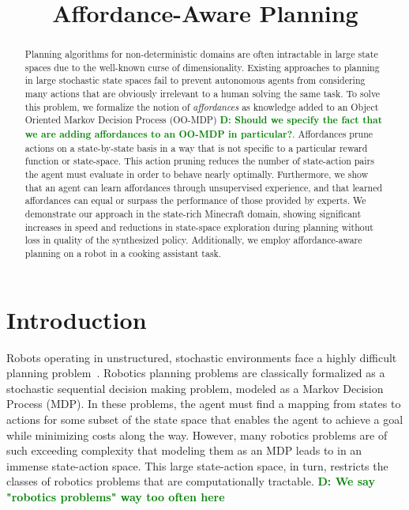 \documentclass[conference]{IEEEtran}
\newcommand{\dnote}[1]{\textcolor{Green}{\textbf{D: #1}}}
\begin{document}
\title{Affordance-Aware Planning}

\author{
}

\maketitle

\begin{abstract}
Planning algorithms for non-deterministic domains are often
intractable in large state spaces due to the well-known curse of
dimensionality. Existing approaches to planning in large stochastic state spaces fail to
prevent autonomous agents from considering many actions that are
obviously irrelevant to a human solving the same task. To solve this problem,
we formalize the notion of {\em affordances} as knowledge added to an 
Object Oriented Markov Decision Process (OO-MDP) \dnote{Should we specify the fact that
we are adding affordances to an OO-MDP in particular?}.
Affordances prune actions on a state-by-state basis in a way that is
not specific to a particular reward function or state-space. This action pruning
reduces the number of state-action pairs the agent must evaluate
in order to behave nearly optimally. Furthermore, we show that an
agent can learn affordances through unsupervised experience, and that learned
affordances can equal or surpass the performance of those
provided by experts. We demonstrate our approach in the state-rich
Minecraft domain, showing significant increases in speed and reductions in state-space exploration during
planning without loss in quality of the synthesized policy. Additionally, we employ affordance-aware planning on a robot in a cooking assistant task. 

\end{abstract}

\IEEEpeerreviewmaketitle

\section{Introduction}
\label{sec:introduction}

Robots operating in unstructured, stochastic environments face
a highly difficult planning problem~\citep{bollini12, knepper13}.
Robotics planning problems are classically formalized as a stochastic sequential
decision making problem, modeled as a Markov Decision Process (MDP). In these problems,
the agent must find a mapping from states to actions for some subset of the state space that enables the
agent to achieve a goal while minimizing costs along the way. However, many robotics 
problems are of such exceeding complexity that modeling them as an MDP
leads to in an immense state-action space. This large state-action space, in turn, 
restricts the classes of robotics problems that are computationally tractable.
 \dnote{We say "robotics problems" way too often here}
 
\end{document}
